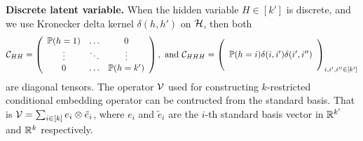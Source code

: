 \documentclass[11pt]{article}
\begin{document}
{\bf Discrete latent variable.} When the hidden variable $H \in [k']$ is discrete, and we use Kronecker delta kernel $\delta(h,h')$ on $\mathcal{H}$, then both 
\begin{align}
 \mathcal{C}_{HH} = \left(
  \begin{array}{ccc}
    \mathbb{P}(h=1) & \ldots & 0 \cr
    \vdots & \ddots & \vdots \cr
    0 & \ldots & \mathbb{P}(h=k') 
  \end{array}
 \right), 
 ~\text{and}~
 \mathcal{C}_{HHH} = \left(
  \begin{array}{c}
    \cr
    \mathbb{P}(h=i) \delta(i,i') \delta(i',i'') \cr
    \cr
  \end{array}
 \right)_{i,i',i''\in[k']} 
\end{align}
are diagonal tensors. The operator $\mathcal{V}$ used for constructing $k$-restricted conditional embedding operator can be contructed from the standard basis. That is $\mathcal{V} = \sum_{i \in [k]} e_i \otimes \tilde e_i$, where $e_i$ and $\tilde e_i$ are the $i$-th standard basis vector in $\mathbb{R}^{k'}$ and $\mathbb{R}^k$ respectively.     

\end{document}
